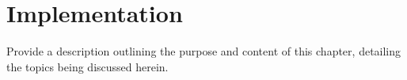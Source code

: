 \chapter{Implementation}
\label{chap:Implementation}
Provide a description outlining the purpose and content of this chapter, detailing the topics being discussed herein.





